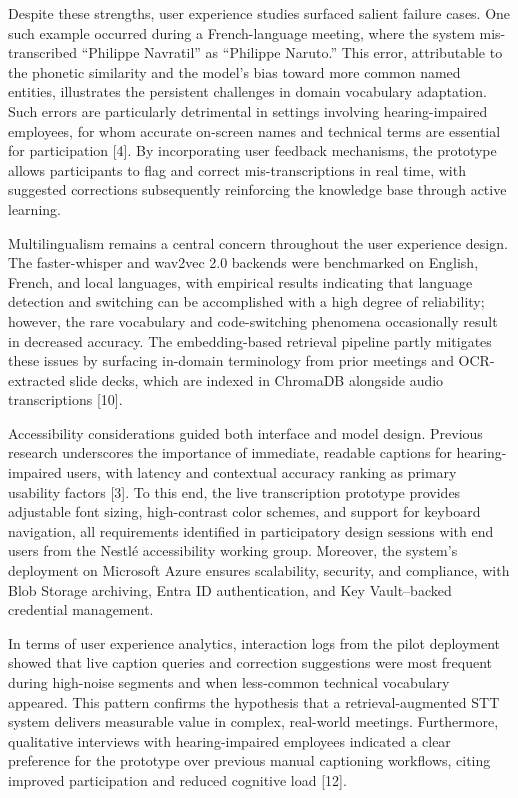 \documentclass[12pt,a4paper]{article}
\begin{document}
Despite these strengths, user experience studies surfaced salient failure cases. One such example occurred during a French-language meeting, where the system mis-transcribed “Philippe Navratil” as “Philippe Naruto.” This error, attributable to the phonetic similarity and the model’s bias toward more common named entities, illustrates the persistent challenges in domain vocabulary adaptation. Such errors are particularly detrimental in settings involving hearing-impaired employees, for whom accurate on-screen names and technical terms are essential for participation [4]. By incorporating user feedback mechanisms, the prototype allows participants to flag and correct mis-transcriptions in real time, with suggested corrections subsequently reinforcing the knowledge base through active learning.


Multilingualism remains a central concern throughout the user experience design. The faster-whisper and wav2vec 2.0 backends were benchmarked on English, French, and local languages, with empirical results indicating that language detection and switching can be accomplished with a high degree of reliability; however, the rare vocabulary and code-switching phenomena occasionally result in decreased accuracy. The embedding-based retrieval pipeline partly mitigates these issues by surfacing in-domain terminology from prior meetings and OCR-extracted slide decks, which are indexed in ChromaDB alongside audio transcriptions [10].


Accessibility considerations guided both interface and model design. Previous research underscores the importance of immediate, readable captions for hearing-impaired users, with latency and contextual accuracy ranking as primary usability factors [3]. To this end, the live transcription prototype provides adjustable font sizing, high-contrast color schemes, and support for keyboard navigation, all requirements identified in participatory design sessions with end users from the Nestlé accessibility working group. Moreover, the system’s deployment on Microsoft Azure ensures scalability, security, and compliance, with Blob Storage archiving, Entra ID authentication, and Key Vault–backed credential management.


In terms of user experience analytics, interaction logs from the pilot deployment showed that live caption queries and correction suggestions were most frequent during high-noise segments and when less-common technical vocabulary appeared. This pattern confirms the hypothesis that a retrieval-augmented STT system delivers measurable value in complex, real-world meetings. Furthermore, qualitative interviews with hearing-impaired employees indicated a clear preference for the prototype over previous manual captioning workflows, citing improved participation and reduced cognitive load [12].
\end{document}
